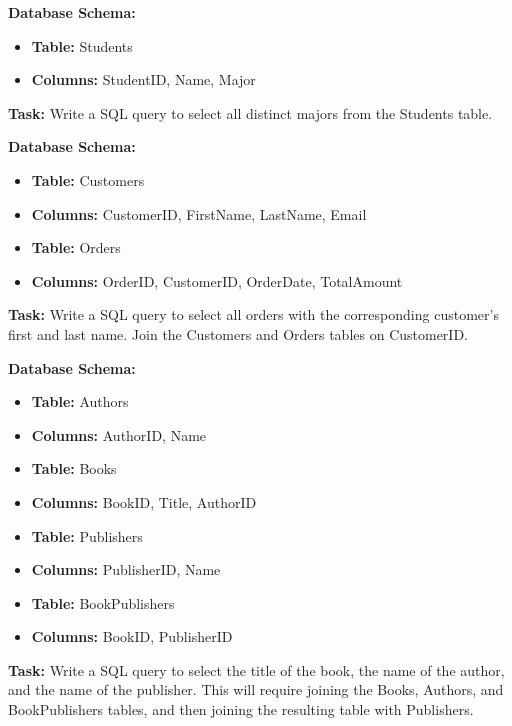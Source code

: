 \begin{exerciseboxcomputer}
\noindent \textbf{Database Schema:}
\begin{itemize}
    \item \textbf{Table:} Students
    \item \textbf{Columns:} StudentID, Name, Major
\end{itemize}

\noindent \textbf{Task:} Write a SQL query to select all distinct majors from the Students table.\\
\end{exerciseboxcomputer}

\begin{exerciseboxcomputer}
\noindent \textbf{Database Schema:} 
\begin{itemize}
    \item \textbf{Table:} Customers
    \item \textbf{Columns:} CustomerID, FirstName, LastName, Email
    \item \textbf{Table:} Orders
    \item \textbf{Columns:} OrderID, CustomerID, OrderDate, TotalAmount
\end{itemize}

\noindent \textbf{Task:} Write a SQL query to select all orders with the corresponding customer's first and last name. Join the Customers and Orders tables on CustomerID.\\
\end{exerciseboxcomputer}

\begin{exerciseboxcomputer}
\noindent \textbf{Database Schema:}
\begin{itemize}
    \item \textbf{Table:} Authors
    \item \textbf{Columns:} AuthorID, Name
    \item \textbf{Table:} Books
    \item \textbf{Columns:} BookID, Title, AuthorID
    \item \textbf{Table:} Publishers
    \item \textbf{Columns:} PublisherID, Name
    \item \textbf{Table:} BookPublishers
    \item \textbf{Columns:} BookID, PublisherID
\end{itemize}

\noindent \textbf{Task:} Write a SQL query to select the title of the book, the name of the author, and the name of the publisher. This will require joining the Books, Authors, and BookPublishers tables, and then joining the resulting table with Publishers.\\
\end{exerciseboxcomputer}

